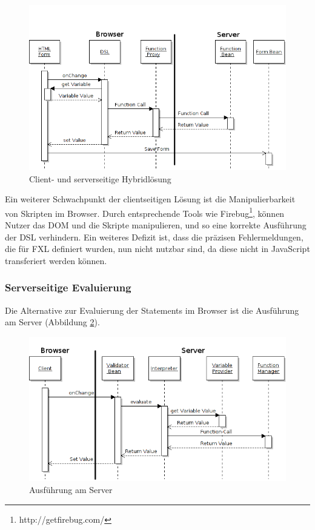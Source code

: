 \begin{figure}[h]
\begin{center}
\includegraphics[scale=0.55]{figures/uml_seq_client_hybrid_neu}
\end{center}

\caption{Client- und serverseitige Hybridlösung}
\label{abb_uml_seq_client_hybrid}
\end{figure}

Ein weiterer Schwachpunkt der clientseitigen Lösung ist die Manipulierbarkeit von Skripten im Browser. Durch ent\-sprech\-ende Tools wie Firebug\footnote{http://getfirebug.com/}, können Nutzer das DOM und die Skripte manipulieren, und so eine korrekte Aus\-führ\-ung der DSL verhindern. Ein weiteres Defizit ist, dass die präzisen Fehlermeldungen, die für FXL definiert wurden, nun nicht nutzbar sind, da diese nicht in Java\-Script transferiert werden können.

\subsubsection{Serverseitige Evaluierung}

Die Alternative zur Evaluierung der Statements im Browser ist die Aus\-führ\-ung am Server (Abbildung \ref{abb_uml_seq_server}).

\begin{figure}[ht]
\includegraphics[scale=0.55]{figures/uml_seq_server_neu}
\caption{Aus\-führ\-ung am Server}
\label{abb_uml_seq_server}
\end{figure}

